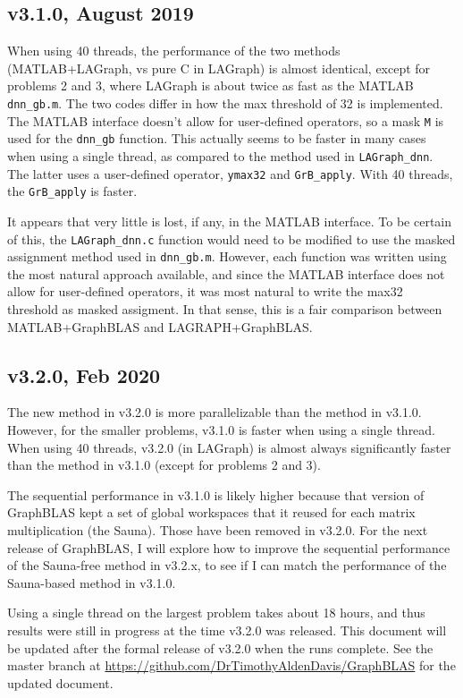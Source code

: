\documentclass[12pt]{article}
\begin{document}
\subsection{v3.1.0, August 2019}

When using 40 threads, the performance of the two methods
(MATLAB+LAGraph, vs pure C in LAGraph) is
almost identical, except for problems 2 and 3, where LAGraph
is about twice as fast as the MATLAB \verb'dnn_gb.m'.
The two codes differ in how the max threshold of 32 is implemented.  The MATLAB
interface doesn't allow for user-defined operators, so a mask \verb'M' is used
for the \verb'dnn_gb' function.  This actually seems to be faster in many cases
when using a single thread, as compared to the method used in
\verb'LAGraph_dnn'.  The latter uses a user-defined operator, \verb'ymax32' and
\verb'GrB_apply'.  With 40 threads, the \verb'GrB_apply' is faster.

  It appears
that very little is lost, if any, in the MATLAB interface.  To be certain of
this, the \verb'LAGraph_dnn.c' function would need to be modified to use the
masked assignment method used in \verb'dnn_gb.m'.  However, each function was
written using the most natural approach available, and since the MATLAB
interface does not allow for user-defined operators, it was most natural to
write the max32 threshold as masked assigment.  In that sense, this is a
fair comparison between MATLAB+GraphBLAS and LAGRAPH+GraphBLAS.

\subsection{v3.2.0, Feb 2020}

The new method in v3.2.0 is more parallelizable than the method in v3.1.0.
However, for the smaller problems, v3.1.0 is faster when using a single thread.
When using 40 threads, v3.2.0 (in LAGraph) is almost always significantly
faster than the method in v3.1.0 (except for problems 2 and 3).

The sequential performance in v3.1.0 is likely higher because that version of
GraphBLAS kept a set of global workspaces that it reused for each matrix
multiplication (the Sauna).  Those have been removed in v3.2.0.  For the next
release of GraphBLAS, I will explore how to improve the sequential performance
of the Sauna-free method in v3.2.x, to see if I can match the performance of
the Sauna-based method in v3.1.0.

Using a single thread on the largest problem takes about 18 hours, and thus
results were still in progress at the time v3.2.0 was released.  This document
will be updated after the formal release of v3.2.0 when the runs complete.  See
the master branch at \url{https://github.com/DrTimothyAldenDavis/GraphBLAS} for
the updated document.
\end{document}

